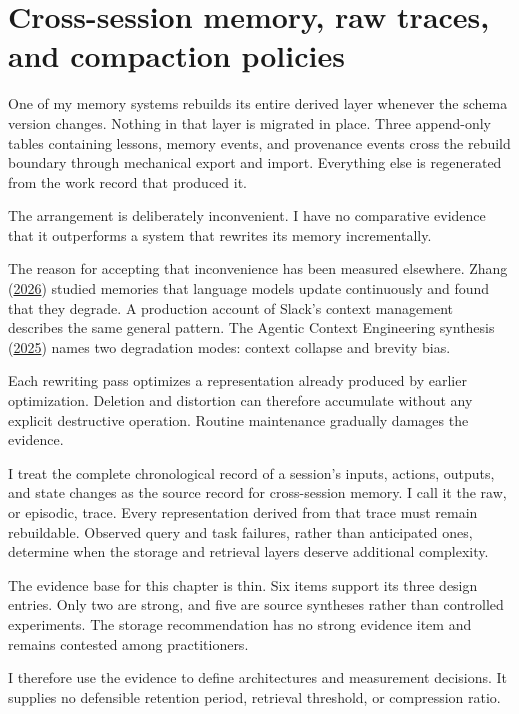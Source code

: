 \chapter{Cross-session memory, raw traces, and compaction policies}
\label{ch14-cross-session-memory-raw-traces-compaction}
One of my memory systems rebuilds its entire derived layer whenever the schema version changes. Nothing in that layer is migrated in place. Three append-only tables containing lessons, memory events, and provenance events cross the rebuild boundary through mechanical export and import. Everything else is regenerated from the work record that produced it.

The arrangement is deliberately inconvenient. I have no comparative evidence that it outperforms a system that rewrites its memory incrementally.

The reason for accepting that inconvenience has been measured elsewhere. Zhang (\href{https://arxiv.org/abs/2605.12978}{2026}) studied memories that language models update continuously and found that they degrade. A production account of Slack's context management describes the same general pattern. The Agentic Context Engineering synthesis (\href{https://arxiv.org/abs/2510.04618}{2025}) names two degradation modes: context collapse and brevity bias.

Each rewriting pass optimizes a representation already produced by earlier optimization. Deletion and distortion can therefore accumulate without any explicit destructive operation. Routine maintenance gradually damages the evidence.

I treat the complete chronological record of a session's inputs, actions, outputs, and state changes as the source record for cross-session memory. I call it the raw, or episodic, trace. Every representation derived from that trace must remain rebuildable. Observed query and task failures, rather than anticipated ones, determine when the storage and retrieval layers deserve additional complexity.

The evidence base for this chapter is thin. Six items support its three design entries. Only two are strong, and five are source syntheses rather than controlled experiments. The storage recommendation has no strong evidence item and remains contested among practitioners.

I therefore use the evidence to define architectures and measurement decisions. It supplies no defensible retention period, retrieval threshold, or compression ratio.

